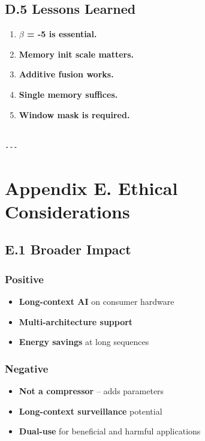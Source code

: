 \subsection{D.5 Lessons Learned}

\begin{enumerate}
\item \textbf{$\beta$ = -5 is essential.}
\item \textbf{Memory init scale matters.}
\item \textbf{Additive fusion works.}
\item \textbf{Single memory suffices.}
\item \textbf{Window mask is required.}
\end{enumerate}
\begin{lstlisting}

---
\end{lstlisting}


\section{Appendix E. Ethical Considerations}

\subsection{E.1 Broader Impact}

\subsubsection{Positive}
\begin{itemize}
\item \textbf{Long-context AI} on consumer hardware
\item \textbf{Multi-architecture support}
\item \textbf{Energy savings} at long sequences

\end{itemize}
\subsubsection{Negative}
\begin{itemize}
\item \textbf{Not a compressor} -- adds parameters
\item \textbf{Long-context surveillance} potential
\item \textbf{Dual-use} for beneficial and harmful applications

\end{itemize}
